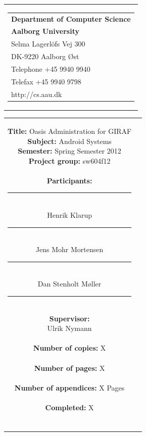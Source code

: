 \begin{nopagebreak}
\samepage 
\begin{tabular}{r}
\parbox{\textwidth}{
\hfill \parbox{6.2cm}{\begin{tabular}{l}
{\textsf\small \textbf{Department of Computer Science }}\\
{\textsf\small  \textbf{Aalborg University}}\\
{\textsf\small Selma Lagerl\"{o}fs Vej 300}\\
{\textsf\small DK-9220 Aalborg Øst}\\
{\textsf\small Telephone +45 9940 9940}\\
{\textsf\small Telefax +45 9940 9798}\\
{\textsf\small http://cs.aau.dk}
\end{tabular}}}
\end{tabular}

\begin{tabular}{cc}
\parbox{7cm}{
\textbf{Title:} 
Oasis Administration for GIRAF\\
\textbf{Subject:} 
Android Systems\\
\textbf{Semester:} Spring Semester 2012\\
\textbf{Project group:} sw604f12\\ \\
\textbf{Participants:} \\
\rule[-0.1cm]{5cm}{0.01cm} \\
Henrik Klarup \\
\rule[-0.1cm]{5cm}{0.01cm} \\
Jens Mohr Mortensen \\
\rule[-0.1cm]{5cm}{0.01cm} \\
Dan Stenholt Møller \\
\rule[-0.1cm]{5cm}{0.01cm} \\
\textbf{Supervisor:} \\
Ulrik Nymann\\ \\
\textbf{Number of copies:}
X \\ \\
\textbf{Number of pages:}
X \\ \\
\textbf{Number of appendices:}
X Pages\\ \\
\textbf{Completed:}
X \\ \\
}


\end{tabular}
\end{nopagebreak}
